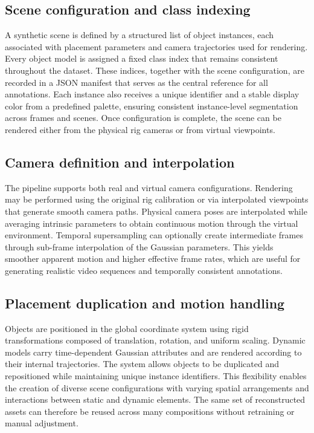 \subsection{Scene configuration and class indexing}
A synthetic scene is defined by a structured list of object instances, each associated with placement parameters and camera trajectories used for rendering. Every object model is assigned a fixed class index that remains consistent throughout the dataset. These indices, together with the scene configuration, are recorded in a JSON manifest that serves as the central reference for all annotations. Each instance also receives a unique identifier and a stable display color from a predefined palette, ensuring consistent instance-level segmentation across frames and scenes. Once configuration is complete, the scene can be rendered either from the physical rig cameras or from virtual viewpoints.

\subsection{Camera definition and interpolation}
The pipeline supports both real and virtual camera configurations. Rendering may be performed using the original rig calibration or via interpolated viewpoints that generate smooth camera paths. Physical camera poses are interpolated while averaging intrinsic parameters to obtain continuous motion through the virtual environment. Temporal supersampling can optionally create intermediate frames through sub-frame interpolation of the Gaussian parameters. This yields smoother apparent motion and higher effective frame rates, which are useful for generating realistic video sequences and temporally consistent annotations.

\subsection{Placement duplication and motion handling}
Objects are positioned in the global coordinate system using rigid transformations composed of translation, rotation, and uniform scaling. Dynamic models carry time-dependent Gaussian attributes and are rendered according to their internal trajectories. The system allows objects to be duplicated and repositioned while maintaining unique instance identifiers. This flexibility enables the creation of diverse scene configurations with varying spatial arrangements and interactions between static and dynamic elements. The same set of reconstructed assets can therefore be reused across many compositions without retraining or manual adjustment.

